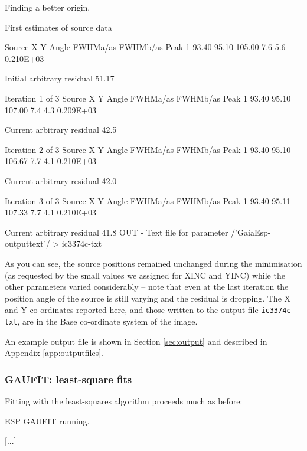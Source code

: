 \documentclass[twoside,11pt]{starlink}
\begin{document}
\begin{small}
\begin{terminalv}
Finding a better origin.

First estimates of source data

Source      X           Y         Angle   FWHMa/as     FWHMb/as         Peak
  1       93.40       95.10      105.00     7.6          5.6        0.210E+03

Initial arbitrary residual   51.17


Iteration  1  of  3
Source      X           Y         Angle   FWHMa/as     FWHMb/as         Peak
  1       93.40       95.10      107.00     7.4          4.3        0.209E+03

Current arbitrary residual   42.5

Iteration  2  of  3
Source      X           Y         Angle   FWHMa/as     FWHMb/as         Peak
  1       93.40       95.10      106.67     7.7          4.1        0.210E+03

Current arbitrary residual   42.0

Iteration  3  of  3
Source      X           Y         Angle   FWHMa/as     FWHMb/as         Peak
  1       93.40       95.11      107.33     7.7          4.1        0.210E+03

Current arbitrary residual   41.8
OUT - Text file for parameter /'GaiaEsp-outputtext'/ > ic3374c-txt
\end{terminalv}
\end{small}

As you can see, the source positions remained unchanged during the minimisation
(as requested by the small values we assigned for XINC and YINC) while
the other parameters varied considerably -- note that even at the last
iteration the position angle of the source is still varying and the
residual is dropping.
The X and Y co-ordinates reported here,
and those written to the output file \texttt{ic3374c-txt},
are in the Base co-ordinate system of the image.

An example output file is shown in Section \ref{sec:output}
and described in Appendix \ref{app:outputfiles}.

\subsubsection{GAUFIT: least-square fits}

Fitting with the least-squares algorithm proceeds much as before:

\begin{terminalv}

ESP GAUFIT running.

[...]
\end{terminalv}
\end{document}
